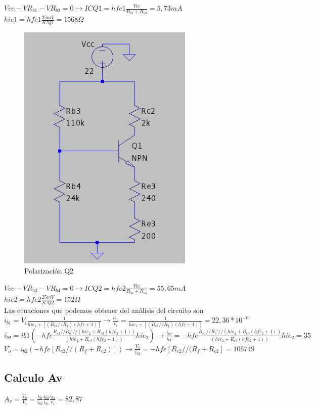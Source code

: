 \documentclass[12pt, letterpaper]{article}
\begin{document}
$Vcc-VR_{b1}-VR_{b2}=0 \rightarrow ICQ1=hfe1\frac{Vcc}{R_{b1}+R_{b2}}=5,73mA$
\\
$hie1=hfe1\frac{25mV}{ICQ1}=1568\Omega$
\begin{figure}[H]
	\centering
	\includegraphics[width=0.75\textwidth]{Imagenes/PolarizaQ2.png}
	\caption{Polarización Q2}
	\label{fig:pol_Q2}
\end{figure}
$Vcc-VR_{b3}-VR_{b4}=0 \rightarrow ICQ2=hfe2\frac{Vcc}{R_{b3}+R_{b4}}=55,65mA$
\\
$hie2=hfe2\frac{25mV}{ICQ2}=152\Omega$
\\

Las ecuaciones que podemos obtener del análisis del circuito son
\singlespacing
$i_{b1}=V_i\frac{1}{hie_1+[(R_{e1}//R_f)(hfe + 1)]} \rightarrow \frac{i_{b1}}{v_i}=\frac{1}{hie_1+[(R_{e1}//R_f)(hfe + 1)]}=22,36*10^{-6}$
\singlespacing
$ i_{b2}=ib1(-hfe\frac{R_{e1}//R_b'//(hie_2+R_{e3}(hfe_2+1))}{(hie_2+R_{e3}(hfe_2+1))}{hie_2}) \rightarrow \frac{i_{b2}}{i_{b1}}=-hfe\frac{R_{e1}//R_b'//(hie_2+R_{e3}(hfe_2+1))}{(hie_2+R_{e3}(hfe_2+1))}{hie_2}=35$
\singlespacing
$V_o=i_{b2}(-hfe[R_{e2}//(R_f+R_{e2})]) \rightarrow \frac{V_o}{i_{b2}}=-hfe[R_{e2}//(R_f+R_{e2}]=105749$
\subsection{Calculo Av}
$A_v=\frac{V_o}{V_i}=\frac{v_o}{i_{b2}}\frac{i_{b2}}{i_{b1}}\frac{i_{b1}}{v_i}=82,87$
\end{document}
